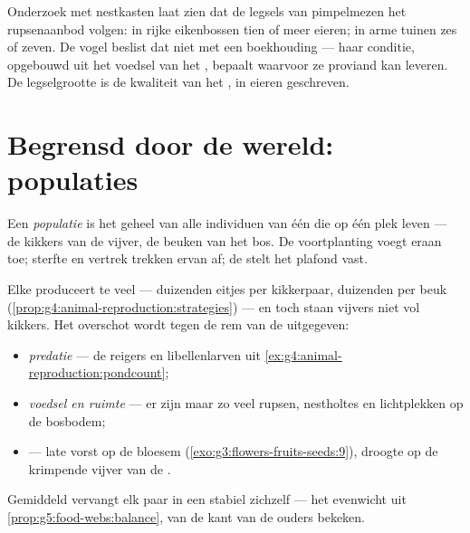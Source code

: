 \begin{example}\label{ex:g8:reproduction-and-environment:clutch}
Onderzoek met nestkasten laat zien dat de legsels van pimpelmezen het
rupsenaanbod volgen: in rijke eikenbossen tien of meer eieren; in arme
tuinen zes of zeven. De vogel beslist dat niet met een boekhouding ---
haar conditie, opgebouwd uit het voedsel van het , bepaalt
waarvoor ze proviand kan leveren. De legselgrootte is de kwaliteit van het
, in eieren geschreven.
\end{example}

\section{Begrensd door de wereld: populaties}

\begin{definition}[Populatie]\label{def:g8:reproduction-and-environment:population}
Een \emph{populatie} is het geheel van alle individuen
van één  die op één plek leven --- de kikkers van de vijver, de
beuken van het bos. De voortplanting voegt eraan toe; sterfte en vertrek
trekken ervan af; de  stelt het plafond vast.
\end{definition}

\begin{proposition}\label{prop:g8:reproduction-and-environment:limits}
Elke  produceert te veel --- duizenden eitjes per kikkerpaar,
duizenden  per beuk
(\cref{prop:g4:animal-reproduction:strategies}) --- en toch staan vijvers
niet vol kikkers. Het overschot wordt tegen de rem van de 
uitgegeven:
\begin{itemize}
  \item \emph{predatie} --- de reigers en libellenlarven uit
        \cref{ex:g4:animal-reproduction:pondcount};
  \item \emph{voedsel en ruimte} --- er zijn maar zo veel rupsen,
        nestholtes en lichtplekken op de bosbodem;
  \item \emph{} --- late vorst op de bloesem
        (\cref{exo:g3:flowers-fruits-seeds:9}), droogte op de krimpende
        vijver van de .
\end{itemize}
Gemiddeld vervangt elk paar in een stabiel  zichzelf --- het
evenwicht uit \cref{prop:g5:food-webs:balance}, van de kant van de ouders
bekeken.
\end{proposition}
\admitted

